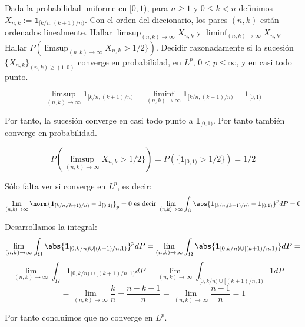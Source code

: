\begin{problem}[7] Dada la probabilidad uniforme en $[0,1)$,  para $n \ge 1$ y $0 \le k < n$ definimos 
$X_{n,k} :=\mathbf{1}_{[k/n, (k + 1)/n)}$. Con el orden
del diccionario, los pares $(n,k)$ est\'an ordenados linealmente. Hallar  $\limsup_{(n,k)\to \infty} X_{n,k}$
y  $\liminf_{(n,k)\to \infty} X_{n,k}$. Hallar $P(\limsup_{(n,k)\to \infty} X_{n,k} > 1/2\})$.
Decidir razonadamente si la sucesi\'on  $\{ X_{n,k}\}_{(n, k) \ge (1,0)} $
converge en probabilidad, en $L^p$,  $0 < p \le \infty$, y  en casi todo punto.


\solution

\[
\limsup_{(n,k)\to \infty} \mathbf{1}_{[k/n, (k + 1)/n)} = \liminf_{(n,k)\to \infty} \mathbf{1}_{[k/n, (k + 1)/n)} = \mathbf{1}_{[0,1)}
\]

Por tanto, la sucesión converge en casi todo punto a $\mathbf{1}_{[0,1)}$. Por tanto también converge en probabilidad.

\[
P(\limsup_{(n,k)\to \infty} X_{n,k} > 1/2\}) = P(\{\mathbf{1}_{[0,1)} > 1/2\}) = 1/2
\]

Sólo falta ver si converge en $L^p$, es decir:
\[
\lim_{(n,k) \rightarrow \infty} \norm{\mathbf{1}_{[k/n, (k + 1)/n)} -\mathbf{1}_{[0,1)}}_p = 0 \text{ es decir } \lim_{(n,k) \rightarrow \infty} \int_{\Omega} \abs{\mathbf{1}_{[k/n, (k + 1)/n)} -\mathbf{1}_{[0,1)}}^p dP = 0
\]

Desarrollamos la integral:
\[
\lim_{(n,k) \rightarrow \infty} \int_{\Omega} \abs{\mathbf{1}_{[0,k/n)\cup[(k + 1)/n,1)}}^p dP = \lim_{(n,k) \rightarrow \infty} \int_{\Omega} \abs{\mathbf{1}_{[0,k/n)\cup[(k + 1)/n,1)}} dP = 
\]
\[
\lim_{(n,k) \rightarrow \infty} \int_{\Omega} \mathbf{1}_{[0,k/n)\cup[(k + 1)/n,1)} dP = \lim_{(n,k) \rightarrow \infty} \int_{[0,k/n)\cup[(k + 1)/n,1)} 1 dP =
\]
\[
= \lim_{(n,k) \rightarrow \infty} \frac{k}{n}+\frac{n-k-1}{n} = \lim_{(n,k) \rightarrow \infty} \frac{n-1}{n} = 1
\]

Por tanto concluimos que no converge en $L^p$.


\end{problem}


